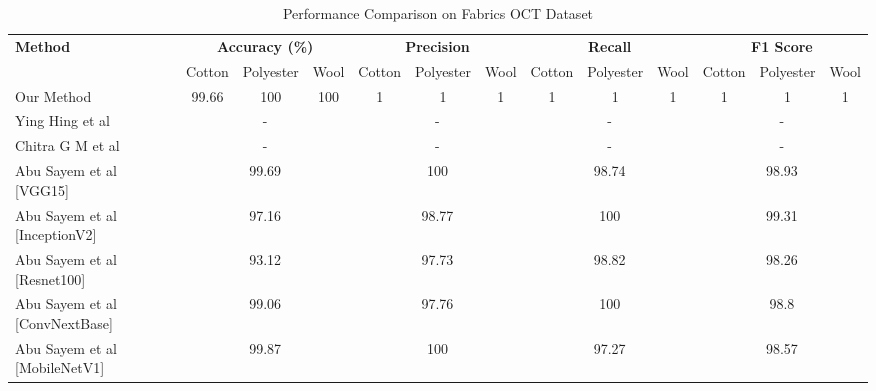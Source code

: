 \begin{table}[htbp]
\centering
\caption{Performance Comparison on Fabrics OCT Dataset}
\label{tab:oct_results}
\begin{adjustbox}{width=\textwidth}
\begin{tabular}{||l||ccc||ccc||ccc||ccc||}
\hline\hline
\multirow{2}{*}{\textbf{Method}} & \multicolumn{3}{c||}{\textbf{Accuracy (\%)}} & \multicolumn{3}{c||}{\textbf{Precision}} & \multicolumn{3}{c||}{\textbf{Recall}} & \multicolumn{3}{c||}{\textbf{F1 Score}} \\
\cline{2-13}
 & Cotton & Polyester & Wool & Cotton & Polyester & Wool & Cotton & Polyester & Wool & Cotton & Polyester & Wool \\
\hline\hline
Our Method & 99.66 & 100 & 100 & 1 & 1 & 1 & 1 & 1 & 1 & 1 & 1 & 1 \\
\hline
Ying Hing et al~\cite{hong2024research} & \multicolumn{3}{|c||}{-} & \multicolumn{3}{|c||}{-} & \multicolumn{3}{|c||}{-} & \multicolumn{3}{|c||}{-} \\
\hline
Chitra G M et al~\cite{chitra2023fabric} & \multicolumn{3}{|c||}{-} & \multicolumn{3}{|c||}{-} & \multicolumn{3}{|c||}{-} & \multicolumn{3}{|c||}{-} \\
\hline
Abu Sayem et al [VGG15]~\cite{siam2023textilenet} & \multicolumn{3}{|c||}{99.69} & \multicolumn{3}{|c||}{100} & \multicolumn{3}{|c||}{98.74} & \multicolumn{3}{|c||}{98.93} \\
\hline
Abu Sayem et al [InceptionV2]~\cite{siam2023textilenet} & \multicolumn{3}{|c||}{97.16} & \multicolumn{3}{|c||}{98.77} & \multicolumn{3}{|c||}{100} & \multicolumn{3}{|c||}{99.31} \\
\hline
Abu Sayem et al [Resnet100]~\cite{siam2023textilenet} & \multicolumn{3}{|c||}{93.12} & \multicolumn{3}{|c||}{97.73} & \multicolumn{3}{|c||}{98.82} & \multicolumn{3}{|c||}{98.26} \\
\hline
Abu Sayem et al [ConvNextBase]~\cite{siam2023textilenet} & \multicolumn{3}{|c||}{99.06} & \multicolumn{3}{|c||}{97.76} & \multicolumn{3}{|c||}{100} & \multicolumn{3}{|c||}{98.8} \\
\hline
Abu Sayem et al [MobileNetV1]~\cite{siam2023textilenet} & \multicolumn{3}{|c||}{99.87} & \multicolumn{3}{|c||}{100} & \multicolumn{3}{|c||}{97.27} & \multicolumn{3}{|c||}{98.57} \\
\hline\hline
\end{tabular}
\end{adjustbox}
\end{table}